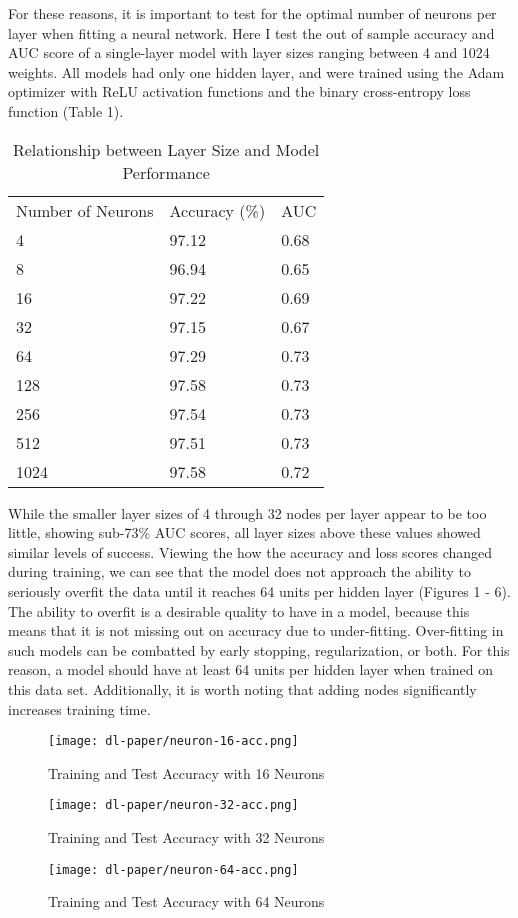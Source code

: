 \documentclass[12pt]{article}  %
\theoremstyle{definition}
\theoremstyle{remark}
\begin{document}
\par For these reasons, it is important to test for the optimal number of neurons per layer when fitting a neural network. Here I test the out of sample accuracy and AUC score of a single-layer model with layer sizes ranging between 4 and 1024 weights. All models had only one hidden layer, and were trained using the Adam optimizer with ReLU activation functions and the binary cross-entropy loss function (Table 1). 

\begin{table}[]
\centering
\caption{Relationship between Layer Size and Model Performance}
\label{my-label}
\begin{tabular}{lll}
Number of Neurons & Accuracy (\%) & AUC  \\
4                 & 97.12         & 0.68 \\
8                 & 96.94         & 0.65 \\
16                & 97.22         & 0.69 \\
32                & 97.15         & 0.67 \\
64                & 97.29         & 0.73 \\
128               & 97.58         & 0.73 \\
256               & 97.54         & 0.73 \\
512               & 97.51         & 0.73 \\
1024              & 97.58         & 0.72
\end{tabular}
\end{table}


\par While the smaller layer sizes of 4 through 32 nodes per layer appear to be too little, showing sub-73\% AUC scores, all layer sizes above these values showed similar levels of success. Viewing the how the accuracy and loss scores changed during training, we can see that the model does not approach the ability to seriously overfit the data until it reaches 64 units per hidden layer (Figures 1 - 6). The ability to overfit is a desirable quality to have in a model, because this means that it is not missing out on accuracy due to under-fitting. Over-fitting in such models can be combatted by early stopping, regularization, or both. For this reason, a model should have at least 64 units per hidden layer when trained on this data set. Additionally, it is worth noting that adding nodes significantly increases training time.

\begin{figure}[!htb]
  \texttt{[image: dl-paper/neuron-16-acc.png]}
  \caption{Training and Test Accuracy with 16 Neurons}\label{small-neuron}
\endminipage\hfill
{}
  \texttt{[image: dl-paper/neuron-32-acc.png]}
  \caption{Training and Test Accuracy with 32 Neurons}\label{med-neuron}
\endminipage\hfill
{}%
  \texttt{[image: dl-paper/neuron-64-acc.png]}
  \caption{Training and Test Accuracy with 64 Neurons}\label{large-neuron}
\endminipage
\end{figure}
\end{document}
